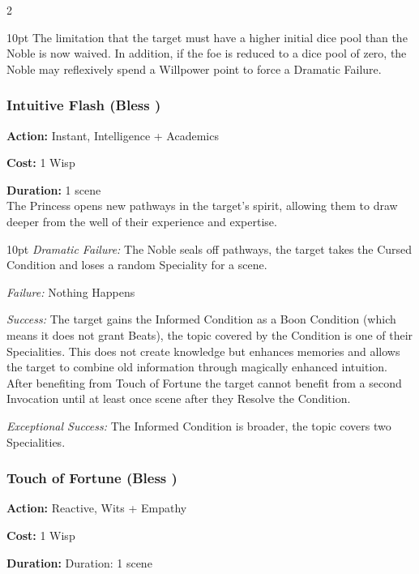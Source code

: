 \begin{multicols}{2}
\begin{myindentpar}{10pt}
The limitation that the target must have a higher initial dice pool than the Noble is now waived. In addition, if the foe is reduced to a dice pool of zero, the Noble may reflexively spend a Willpower point to force a Dramatic Failure.\end{myindentpar}

\subsubsection*{Intuitive Flash (Bless \textbullet\textbullet)}

\noindent \textbf{Action:} Instant, Intelligence + Academics

\noindent \textbf{Cost:} 1 Wisp

\noindent \textbf{Duration:} 1 scene \\

\noindent The Princess opens new pathways in the target's spirit, allowing them to draw deeper from the well of their experience and expertise. 

\begin{myindentpar}{10pt} \emph{Dramatic Failure:} The Noble seals off pathways, the target takes the Cursed Condition and loses a random Speciality for a scene.

\emph{Failure:} Nothing Happens 

\emph{Success:} The target gains the Informed Condition as a Boon Condition (which means it does not grant Beats), the topic covered by the Condition is one of their Specialities. This does not create knowledge but enhances memories and allows the target to combine old information through magically enhanced intuition. After benefiting from Touch of Fortune the target cannot benefit from a second Invocation until at least once scene after they Resolve the Condition. 

\emph{Exceptional Success:} The Informed Condition is broader, the topic covers two Specialities.\end{myindentpar}

\subsubsection*{Touch of Fortune (Bless \textbullet\textbullet)}

\noindent \textbf{Action:} Reactive, Wits + Empathy

\noindent \textbf{Cost:} 1 Wisp

\noindent \textbf{Duration:} Duration: 1 scene \\


\end{multicols}
